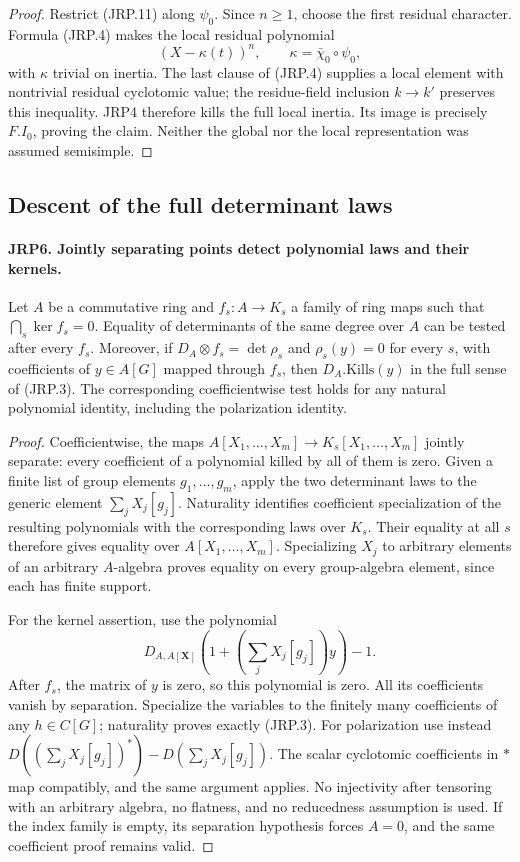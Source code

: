 \begin{proof}
Restrict (JRP.11) along \(\psi_0\).  Since \(n\ge1\), choose
the first residual character.  Formula (JRP.4) makes the local
residual polynomial
\[
                  (X-\kappa(t))^n,
       \qquad\kappa=\bar\chi_0\circ\psi_0,
\]
with \(\kappa\) trivial on inertia.  The last clause of (JRP.4)
supplies a local element with nontrivial residual cyclotomic value;
the residue-field inclusion \(k\to k'\) preserves this
inequality.  JRP4 therefore kills the full local inertia.
Its image is precisely \(F.I_0\), proving the claim.  Neither
the global nor the local representation was assumed semisimple.
\end{proof}

\subsection{Descent of the full determinant laws}

\paragraph{JRP6. Jointly separating points detect polynomial laws and their kernels.}
\label{claim:JRP6}
Let \(A\) be a commutative ring and
\(f_s:A\to K_s\) a family of ring maps such that
\(\bigcap_s\ker f_s=0\).  Equality of determinants of the same
degree over \(A\) can be tested after every \(f_s\).
Moreover, if \(D_A\otimes f_s=\det\rho_s\) and
\(\rho_s(y)=0\) for every \(s\), with coefficients of
\(y\in A[G]\) mapped through \(f_s\), then
\(D_A.\mathrm{Kills}(y)\) in the full sense of (JRP.3).
The corresponding coefficientwise test holds for any natural
polynomial identity, including the polarization identity.
\begin{proof}
Coefficientwise, the maps
\(A[X_1,\ldots,X_m]\to K_s[X_1,\ldots,X_m]\) jointly
separate: every coefficient of a polynomial killed by all of them
is zero.  Given a finite list of group elements \(g_1,\ldots,g_m\),
apply the two determinant laws to the generic element
\(\sum_jX_j[g_j]\).  Naturality identifies coefficient
specialization of the resulting polynomials with the corresponding
laws over \(K_s\).  Their equality at all \(s\) therefore gives
equality over \(A[X_1,\ldots,X_m]\).  Specializing \(X_j\) to
arbitrary elements of an arbitrary \(A\)-algebra proves equality
on every group-algebra element, since each has finite support.

For the kernel assertion, use the polynomial
\[
 D_{A,A[\mathbf X]}
       \left(1+\left(\sum_jX_j[g_j]\right)y\right)-1.
 \tag{JRP.12}
\]
After \(f_s\), the matrix of \(y\) is zero, so this polynomial
is zero.  All its coefficients vanish by separation.  Specialize
the variables to the finitely many coefficients of any
\(h\in C[G]\); naturality proves exactly (JRP.3).
For polarization use instead
\(D((\sum_jX_j[g_j])^*)-D(\sum_jX_j[g_j])\).
The scalar cyclotomic coefficients in \(*\) map compatibly, and
the same argument applies.  No injectivity after tensoring with an
arbitrary algebra, no flatness, and no reducedness assumption is
used.  If the index family is empty, its separation hypothesis
forces \(A=0\), and the same coefficient proof remains valid.
\end{proof}

